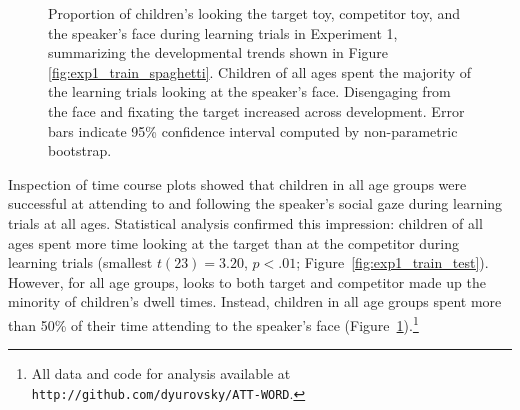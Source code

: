 \documentclass[man,floatsintext]{apa6}
\begin{document}
 \begin{figure}[tb]
	\caption{\label{fig:exp1_train} Proportion of children's looking the target toy, competitor toy, and the speaker's face during learning trials in Experiment 1, summarizing the developmental trends shown in Figure \ref{fig:exp1_train_spaghetti}. Children of all ages spent the majority of the learning trials looking at the speaker's face. Disengaging from the face and fixating the target increased across development. Error bars indicate 95\% confidence interval computed by non-parametric bootstrap.}
\end{figure}

Inspection of time course plots showed that children in all age groups were successful at attending to and following the speaker's social gaze during learning trials at all ages. Statistical analysis confirmed this impression: children of all ages spent more time looking at the target than at the competitor during learning trials (smallest $t(23)  = 3.20$, $p < .01$; Figure~\ref{fig:exp1_train_test}). However, for all age groups, looks to both target and competitor made up the minority of children's dwell times. Instead, children in all age groups spent more than 50\% of their time attending to the speaker's face (Figure~\ref{fig:exp1_train}).\footnote{All data and code for analysis available at \small{\tt{http://github.com/dyurovsky/ATT-WORD}}.} 
\end{document}
